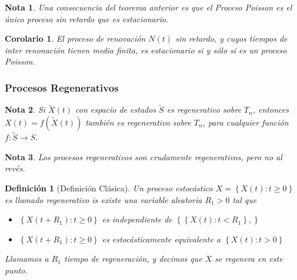 \documentclass{article}
\newtheorem{Def}{Definición}
\newtheorem{Note}{Nota}
\newtheorem{Coro}{Corolario}
\begin{document}
\begin{Note}
Una consecuencia del teorema anterior es que el Proceso Poisson es el \'unico proceso sin retardo que es estacionario.
\end{Note}

\begin{Coro}
El proceso de renovaci\'on $N\left(t\right)$ sin retardo, y cuyos tiempos de inter renonaci\'on tienen media finita, es estacionario si y s\'olo si es un proceso Poisson.

\end{Coro}


\subsubsection{Procesos Regenerativos}



\begin{Note}
Si $\tilde{X}\left(t\right)$ con espacio de estados $\tilde{S}$ es regenerativo sobre $T_{n}$, entonces $X\left(t\right)=f\left(\tilde{X}\left(t\right)\right)$ tambi\'en es regenerativo sobre $T_{n}$, para cualquier funci\'on $f:\tilde{S}\rightarrow S$.
\end{Note}

\begin{Note}
Los procesos regenerativos son crudamente regenerativos, pero no al rev\'es.
\end{Note}
\begin{Def}[Definici\'on Cl\'asica]
Un proceso estoc\'astico $X=\left\{X\left(t\right):t\geq0\right\}$ es llamado regenerativo is existe una variable aleatoria $R_{1}>0$ tal que
\begin{itemize}
\item[i)] $\left\{X\left(t+R_{1}\right):t\geq0\right\}$ es independiente de $\left\{\left\{X\left(t\right):t<R_{1}\right\},\right\}$
\item[ii)] $\left\{X\left(t+R_{1}\right):t\geq0\right\}$ es estoc\'asticamente equivalente a $\left\{X\left(t\right):t>0\right\}$
\end{itemize}

Llamamos a $R_{1}$ tiempo de regeneraci\'on, y decimos que $X$ se regenera en este punto.
\end{Def}
\end{document}
